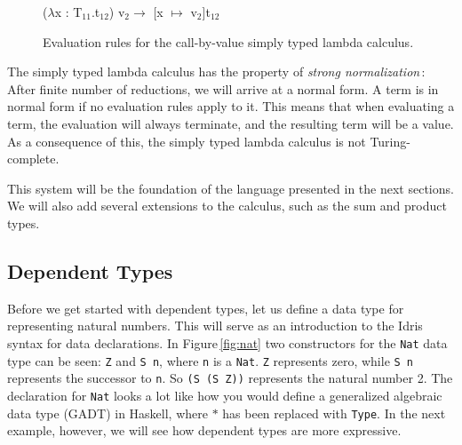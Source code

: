 \begin{center}
\begin{figure}

\begin{prooftree}
\end{prooftree}

\begin{prooftree}
\end{prooftree}

\begin{center}
($\lambda$x : T$_{11}$.t$_{12}$) v$_{2} \longrightarrow$ [x $\mapsto$ v$_{2}$]t$_{12}$ 
\end{center}

\caption{Evaluation rules for the call-by-value simply typed lambda calculus.}
\label{fig:simple-evaluation-rules}

\end{figure}
\end{center}

The simply typed lambda calculus has the property of \emph{strong normalization}\,\cite[pp. 149]{Pierce:TypeSystems}: After finite number of reductions, we will arrive at a normal form. A term is in normal form if no evaluation rules apply to it. This means that when evaluating a term, the evaluation will always terminate, and the resulting term will be a value. As a consequence of this, the simply typed lambda calculus is not Turing-complete.

This system will be the foundation of the language presented in the next sections. We will also add several extensions to the calculus, such as the sum and product types.

\subsection{Dependent Types}
\label{sec:dependent-types-idris}
Before we get started with dependent types, let us define a data type for representing natural numbers. This will serve as an introduction to the Idris syntax for data declarations. In Figure\,\ref{fig:nat} two constructors for the \texttt{Nat} data type can be seen: \texttt{Z} and \texttt{S n}, where \texttt{n} is a \texttt{Nat}. \texttt{Z} represents zero, while \texttt{S n} represents the successor to \texttt{n}. So \texttt{(S (S Z))} represents the natural number 2. The declaration for \texttt{Nat} looks a lot like how you would define a generalized algebraic data type (GADT) in Haskell, where $\ast$ has been replaced with \texttt{Type}. In the next example, however, we will see how dependent types are more expressive.

